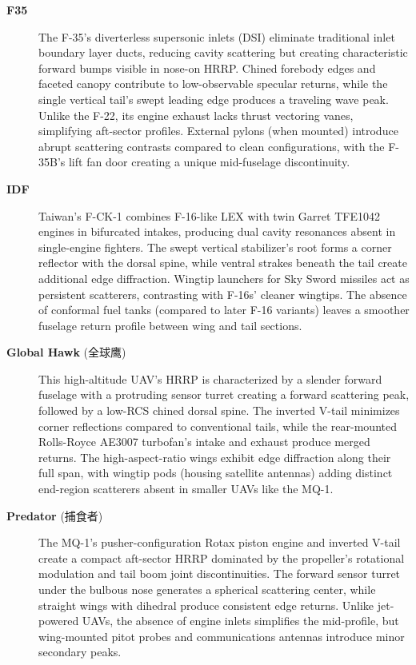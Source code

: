 {\begin{description}
    \item[\textbf{F35}]
    The F-35’s diverterless supersonic inlets (DSI) eliminate traditional inlet boundary layer ducts, reducing cavity scattering but creating characteristic forward bumps visible in nose-on HRRP. Chined forebody edges and faceted canopy contribute to low-observable specular returns, while the single vertical tail’s swept leading edge produces a traveling wave peak. Unlike the F-22, its engine exhaust lacks thrust vectoring vanes, simplifying aft-sector profiles. External pylons (when mounted) introduce abrupt scattering contrasts compared to clean configurations, with the F-35B’s lift fan door creating a unique mid-fuselage discontinuity.

    \item[\textbf{IDF}]
    Taiwan’s F-CK-1 combines F-16-like LEX with twin Garret TFE1042 engines in bifurcated intakes, producing dual cavity resonances absent in single-engine fighters. The swept vertical stabilizer’s root forms a corner reflector with the dorsal spine, while ventral strakes beneath the tail create additional edge diffraction. Wingtip launchers for Sky Sword missiles act as persistent scatterers, contrasting with F-16s’ cleaner wingtips. The absence of conformal fuel tanks (compared to later F-16 variants) leaves a smoother fuselage return profile between wing and tail sections.

    \item[\textbf{Global Hawk} (全球鹰)]
    This high-altitude UAV’s HRRP is characterized by a slender forward fuselage with a protruding sensor turret creating a forward scattering peak, followed by a low-RCS chined dorsal spine. The inverted V-tail minimizes corner reflections compared to conventional tails, while the rear-mounted Rolls-Royce AE3007 turbofan’s intake and exhaust produce merged returns. The high-aspect-ratio wings exhibit edge diffraction along their full span, with wingtip pods (housing satellite antennas) adding distinct end-region scatterers absent in smaller UAVs like the MQ-1.

    \item[\textbf{Predator} (捕食者)]
    The MQ-1’s pusher-configuration Rotax piston engine and inverted V-tail create a compact aft-sector HRRP dominated by the propeller’s rotational modulation and tail boom joint discontinuities. The forward sensor turret under the bulbous nose generates a spherical scattering center, while straight wings with dihedral produce consistent edge returns. Unlike jet-powered UAVs, the absence of engine inlets simplifies the mid-profile, but wing-mounted pitot probes and communications antennas introduce minor secondary peaks.


\end{description}}
